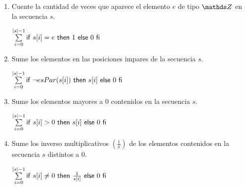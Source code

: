 \begin{enumerate}[label=\alph*)]
      \item Cuente la cantidad de veces que aparece el elemento $e$ de tipo $\ent$ en la secuencia $s$.

            $\sum\limits_{i=0}\limits^{|s| - 1} \mathsf{if}\ s[i] = e\ \mathsf{then}\ 1\ \mathsf{else}\ 0\ \mathsf{fi}$

      \item Sume los elementos en las posiciones impares de la secuencia $s$.

            $\sum\limits_{i=0}\limits^{|s| - 1} \mathsf{if}\ \neg esPar(s[i])\ \mathsf{then}\ s[i]\ \mathsf{else}\ 0\ \mathsf{fi}$

      \item Sume los elementos mayores a 0 contenidos en la secuencia $s$.

            $\sum\limits_{i=0}\limits^{|s| - 1} \mathsf{if}\ s[i] > 0\ \mathsf{then}\ s[i]\ \mathsf{else}\ 0\ \mathsf{fi}$

      \item Sume los inverso multiplicativos $(\frac{1}{x})$ de los elementos contenidos en la secuencia $s$ distintos a 0.

            $\sum\limits_{i=0}\limits^{|s| - 1} \mathsf{if}\ s[i] \neq 0\ \mathsf{then}\ \frac{1}{s[i]}\ \mathsf{else}\ 0\ \mathsf{fi}$
\end{enumerate}


